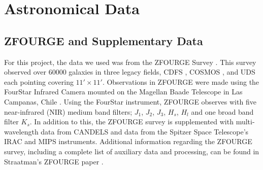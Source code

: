 \documentclass[12pt]{iopart}
\begin{document}
\section{Astronomical Data}
\subsection{ZFOURGE and Supplementary Data}
For this project, the data we used was from the ZFOURGE Survey \cite{straatman_fourstar_2016}. This survey observed over 60000 galaxies in three legacy fields, CDFS \cite{giacconi_chandra_2002}, COSMOS \cite{scoville_cosmic_2007}, and UDS \cite{lawrence_ukirt_2007} each pointing covering $11' \times 11'$. Observations in ZFOURGE were made using the FourStar Infrared Camera mounted on the Magellan Baade Telescope in Las Campanas, Chile \cite{persson_fourstar_2013}. Using the FourStar instrument, ZFOURGE observes with five near-infrared (NIR) medium band filters; $J_1$, $J_2$, $J_3$, $H_s$, $H_l$ and one broad band filter $K_s$. In addition to this, the ZFOURGE survey is supplemented with multi-wavelength data from CANDELS \cite{grogin_candels_2011, koekemoer_candels_2011} and data from the Spitzer Space Telescope's IRAC \cite{fazio_infrared_2004} and MIPS \cite{rieke_multiband_2004} instruments. Additional information regarding the ZFOURGE survey, including a complete list of auxiliary data and processing, can be found in Straatman's ZFOURGE paper \cite{straatman_fourstar_2016}.
\end{document}
